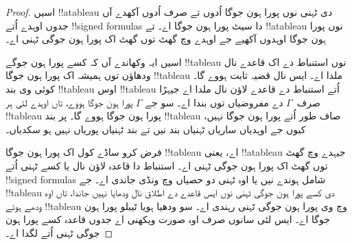 \documentclass[../../../include/open-logic-section]{subfiles}
\begin{document}
\begin{proof}
اسیں !!a{tableau} دی ٹہنی نوں پورا ہون جوگا اُدوں تے صرف اُدوں آکھدے آں
جدوں اوہدے اُتے !!{signed formula}s دا سیٹ پورا ہون جوگا اے۔ تے
!!a{tableau} نوں پورا ہون جوگا اوہدوں آکھیے جے اوہدے وچ گھٹ توں گھٹ
اک پورا ہون جوگی ٹہنی اے۔

اسیں ایہ وکھاندے آں کہ کسے پورا ہون جوگے !!{tableau} نوں استنباط دے
اک قاعدے نال ودھاؤن توں ہمیشہ اک پورا ہون جوگا !!{tableau} ملدا اے۔
ایس نال قضیہ ثابت ہووے گا۔ کوئی وی بند !!{tableau} اوس !!{tableau}
اُتے استنباط دے قاعدے لاؤن نال ملدا اے جیہڑا صرف~$\Gamma$ دے مفروضیاں توں
بندا اے۔ سو جے $\Gamma$ پورا ہون جوگا ہووے، تاں اوہدے لئی ہر !!{tableau}
پورا ہون جوگا ہووے گا۔ پر بند !!{tableau} صاف طور اُتے پورا ہون جوگا نہیں،
کیوں جے اوہدیاں ساریاں ٹہنیاں بند نیں تے بند ٹہنیاں پوریاں نہیں ہو سکدیاں۔

فرض کرو ساڈے کول اک پورا ہون جوگا !!{tableau} اے، یعنی !!a{tableau}
جیہدے وچ گھٹ توں گھٹ اک پورا ہون جوگی ٹہنی اے۔ استنباط دا قاعدہ لاؤن نال
یا کسے ٹہنی اُتے !!{signed formula}s شامل ہوندے نیں یا اوہ ٹہنی دو حصیاں
وچ ونڈی جاندی اے۔ جے !!{tableau} دی کسے پورا ہون جوگی ٹہنی نوں ایس قاعدے دے
اطلاق نال ودھایا نہیں جاندا، تاں اوہ ودھے ہوئے !!{tableau} وچ وی پورا ہون
جوگی ٹہنی رہندی اے۔ سو ودھیا ہویا ٹیبلو پورا ہون جوگا اے۔ ایس لئی سانوں
صرف اوہ صورت ویکھنی اے جدوں قاعدہ کسے پورا ہون جوگی ٹہنی اُتے لگدا اے۔


\end{proof}
\end{document}
